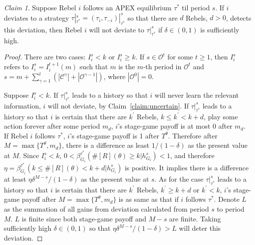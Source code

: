 \documentclass[12pt,letter]{article}
\newcommand{\Kappa}{\mathcal{C}}
\newcommand{\Omicron}{\mathcal{O}}
\theoremstyle{definition}
\theoremstyle{remark}
\theoremstyle{claim}
\newtheorem{claim}{Claim}
\begin{document}
\begin{claim} Suppose Rebel $i$ follows an APEX equilibrium $\tau^{*}$ til period $s$. If $i$ deviates to a strategy $\tau|^s_{\tau^{*}}=(\tau_i,\tau_{-i})|^s_{\tau^{*}}$ so that there are $d$ Rebels, $d>0$, detects this deviation, then Rebel $i$ will not deviate to $\tau|^s_{\tau^{*}}$ if $\delta\in(0,1)$ is sufficiently high.
\end{claim}

\begin{proof}
There are two cases: $I^s_i< k$ or $I^s_i\geq k$. If $s\in \Omicron^t$ for some $t\geq 1$, then $I^s_i$ refers to $I^s_i=I^{t+1}_i(m)$ such that $m$ is the $m$-th period in $\Omicron^t$ and $s=m+\sum^t_{\gamma=1}(|\Kappa^{\gamma}|+|\Omicron^{\gamma-1}|)$, where $|\Omicron^{0}|=0$. 

Suppose $I^s_i< k$. If $\tau|^s_{\tau^{*}}$ leads to a history so that $i$ will never learn the relevant information, $i$ will not deviate, by Claim~\ref{claim:uncertain}. If $\tau|^s_{\tau^{*}}$ leads to a history so that $i$ is certain that there are $k^{'}$ Rebels, $k\leq k^{'}<k+d$, play some action forever after some period $m_d$, $i$'s stage-game payoff  is at most 0 after $m_d$. If Rebel $i$ follows $\tau^{*}$, $i$'s stage-game payoff is 1 after $T^{\theta}$. Therefore after $M=\max\{T^{\theta}, m_d\}$, there is a difference as least $1/(1-\delta)$ as the present value at $M$. Since $I^s_i< k$, $0<\beta^{\tau^{*}}_{G_i}(\#[R](\theta)\geq k|h^s_{G_i})<1$, and therefore $\eta=\beta^{\tau^{*}}_{G_i}(k\leq \#[R](\theta)< k+d|h^s_{G_i})$ is positive. It implies there is a difference at least $\eta\delta^{M-s}/(1-\delta)$ as the present value at $s$. As for the case $\tau|^s_{\tau^{*}}$ leads to a history so that $i$ is certain that there are $k^{'}$ Rebels, $k^{'}\geq k+d$ or $k^{'}<k$, $i$'s stage-game payoff after $M=\max\{T^{\theta},m_d\}$ is as same as that if $i$ follows $\tau^{*}$. Denote $L$ as the summation of all gains from deviation calculated from period $s$ to period $M$. $L$ is finite since both stage-game payoff and $M-s$ are finite. Taking sufficiently high $\delta\in(0,1)$ so that $\eta\delta^{M-s}/(1-\delta)>L$ will deter this deviation.


\end{proof}
\end{document}
